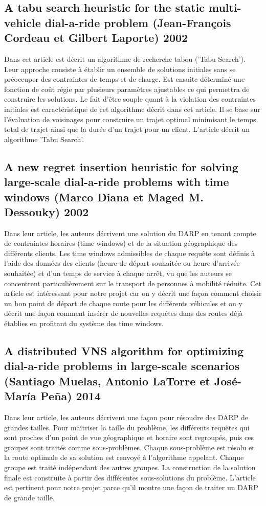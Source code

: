 \documentclass[10pt,a4paper]{report}
\begin{document}
\subsection*{A tabu search heuristic for the static multi-vehicle dial-a-ride problem (Jean-François Cordeau et Gilbert Laporte) 2002}
Dans cet article est décrit un algorithme de recherche tabou ('Tabu Search'). Leur approche consiste à établir un ensemble de solutions initiales sans se préoccuper des contraintes de temps et de charge. Est ensuite déterminé une fonction de coût régie par plusieurs paramètres ajustables ce qui permettra de construire les solutions. Le fait d'être souple quant à la violation des contraintes initiales est caractéristique de cet algorithme décrit dans cet article. Il se base sur l'évaluation de voisinages pour construire un trajet optimal minimisant le temps total de trajet ainsi que la durée d'un trajet pour un client. L'article décrit un algorithme 'Tabu Search'.
\subsection*{A new regret insertion heuristic for solving large-scale dial-a-ride problems with time windows (Marco Diana et Maged M. Dessouky) 2002} 
 Dans leur article, les auteurs décrivent une solution du DARP en tenant compte de contraintes horaires (time windows) et de la situation géographique des différents clients. Les time windows admissibles de chaque requête sont définis à l'aide des données des clients (heure de départ souhaitée ou heure d'arrivée souhaitée) et d'un temps de service à chaque arrêt, vu que les auteurs se concentrent particulièrement sur le transport de personnes à mobilité réduite. Cet article est intéressant pour notre projet car on y décrit une façon comment choisir un bon point de départ de chaque route pour les différents véhicules et on y décrit une façon comment insérer de nouvelles requêtes dans des routes déjà établies en profitant du système des time windows.
\subsection*{A distributed VNS algorithm for optimizing dial-a-ride problems in large-scale scenarios (Santiago Muelas, Antonio LaTorre et José-María Peña) 2014}
Dans leur article, les auteurs décrivent une façon pour résoudre des DARP de grandes tailles. Pour maîtriser la taille du problème, les différents requêtes qui sont proches d'un point de vue géographique et horaire sont regroupés, puis ces groupes sont traités comme sous-problèmes. Chaque sous-problème est résolu et la route optimale de sa solution est renvoyé à l'algorithme appelant. Chaque groupe est traité indépendant des autres groupes. La construction de la solution finale est construite à partir des différentes sous-solutions du problème. L'article est pertinent pour notre projet parce qu'il montre une façon de traiter un DARP de grande taille.
\end{document}
